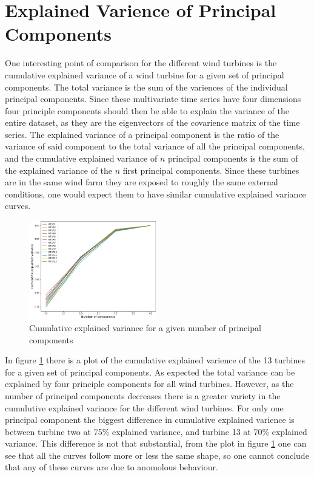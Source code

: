\section{Explained Varience of Principal Components}

One interesting point of comparison for the different wind turbines is the cumulative explained variance of a wind turbine for a given set of principal components. 
The total variance is the sum of the variences of the individual principal components. 
Since these multivariate time series have four dimensions four principle components should then be able to explain the variance of the entire dataset, as they are the eigenvectors of the covarience matrix of the time series. 
The explained variance of a principal component is the ratio of the variance of said component to the total variance of all the principal components, 
and the cumulative explained variance of $n$ principal components is the sum of the explained variance of the $n$ first principal components. 
Since these turbines are in the same wind farm they are exposed to roughly the same external conditions, one would expect them to have similar cumulative explained variance curves.

\begin{figure}[h]
    \begin{center}
    \includegraphics[width=0.5\textwidth]{data_exp/cumulative_explained_variance}
    \end{center}
    \caption{Cumulative explained variance for a given number of principal components} 
    \label{fig:cum_exp_var}
\end{figure}

In figure \ref{fig:cum_exp_var} there is a plot of the cumulative explained varience of the 13 turbines for a given set of principal components. 
As expected the total variance can be explained by four principle components for all wind turbines. 
However, as the number of principal components decreases there is a greater variety in the cumulutive explained variance for the different wind turbines. 
For only one principal component the biggest difference in cumulative explained varience is between turbine two at 75$\%$ explained variance, and turbine 13 at 70$\%$ explained variance.
This difference is not that substantial, from the plot in figure \ref{fig:cum_exp_var} one can see that all the curves follow more or less the same shape, so one cannot conclude that any of these curves are due to anomolous behaviour. \smallskip

